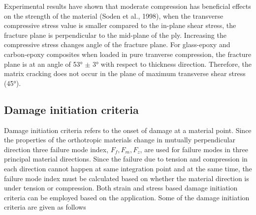 \documentclass[a4paper,12pt]{extarticle}
\begin{document}
 Experimental results have shown that moderate compression has beneficial effects on the strength of the material (Soden et al., 1998), when the transverse compressive stress value is smaller compared to the in-plane shear stress, the fracture plane is perpendicular to the mid-plane of the ply. Increasing the compressive stress changes angle of the fracture plane. For glass-epoxy and carbon-epoxy composites when loaded in pure tranverse compression, the fracture plane is at an angle of 53° $\pm$ 3° with respect to thickness direction. Therefore, the matrix cracking does not occur in the plane of maximum transverse shear stress (45°).



\subsection{Damage initiation criteria}
\indent\indent\indent  Damage initiation criteria refers to the onset of damage at a material point. Since the properties of the orthotropic materials change in mutually perpendicular direction three failure mode index, $F_{f}, F_{m}, F_{z}$, are used for failure modes in three principal material directions. Since the failure due to tension and compression in each direction cannot happen at same integration point and at the same time, the failure mode index must be calculated based on whether the material direction is under tension or compression. Both strain and stress based damage initiation criteria can be employed based on the application. Some of the damage initiation criteria are given as follows
\end{document}
